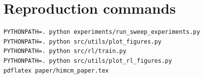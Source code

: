 \documentclass[12pt]{article}
\begin{document}
\section{Reproduction commands}
\begin{verbatim}
PYTHONPATH=. python experiments/run_sweep_experiments.py
PYTHONPATH=. python src/utils/plot_figures.py
PYTHONPATH=. python src/rl/train.py
PYTHONPATH=. python src/utils/plot_rl_figures.py
pdflatex paper/himcm_paper.tex
\end{verbatim}
\end{document}
